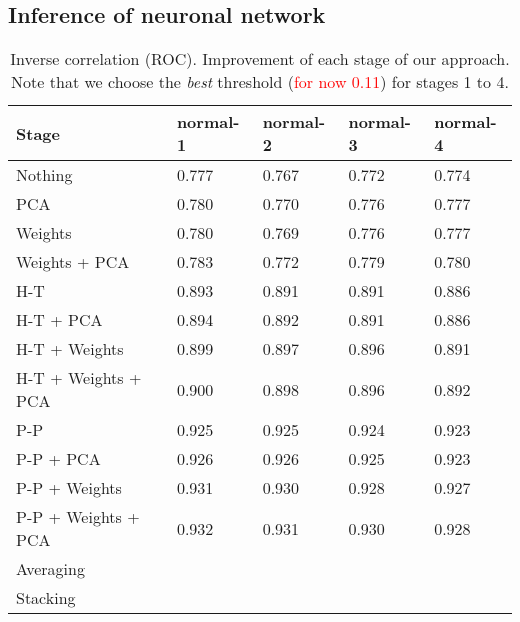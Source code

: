 \documentclass[wcp]{jmlr}
\begin{document}
\subsection{Inference of neuronal network}


\begin{table}[H]
\centering
\caption{Inverse correlation (ROC). Improvement of each stage of our approach. Note that we choose the
         \textit{best} threshold (\textcolor{red}{for now 0.11}) for stages 1 to 4.}
\begin{tabular}{*{5}{l}}
\toprule
Stage               & normal-1 & normal-2 & normal-3 & normal-4 \\
\midrule
Nothing             & 0.777 & 0.767 & 0.772 & 0.774 \\
PCA                 & 0.780 & 0.770 & 0.776 & 0.777 \\
Weights             & 0.780 & 0.769 & 0.776 & 0.777 \\
Weights + PCA       & 0.783 & 0.772 & 0.779 & 0.780 \\
H-T                 & 0.893 & 0.891 & 0.891 & 0.886 \\
H-T + PCA           & 0.894 & 0.892 & 0.891 & 0.886 \\
H-T + Weights       & 0.899 & 0.897 & 0.896 & 0.891 \\
H-T + Weights + PCA & 0.900 & 0.898 & 0.896 & 0.892 \\
P-P                 & 0.925 & 0.925 & 0.924 & 0.923 \\
P-P + PCA           & 0.926 & 0.926 & 0.925 & 0.923 \\
P-P + Weights       & 0.931 & 0.930 & 0.928 & 0.927 \\
P-P + Weights + PCA & 0.932 & 0.931 & 0.930 & 0.928 \\
Averaging           & & & & \\
Stacking            & & & & \\
\bottomrule
\end{tabular}
\end{table}
\end{document}
